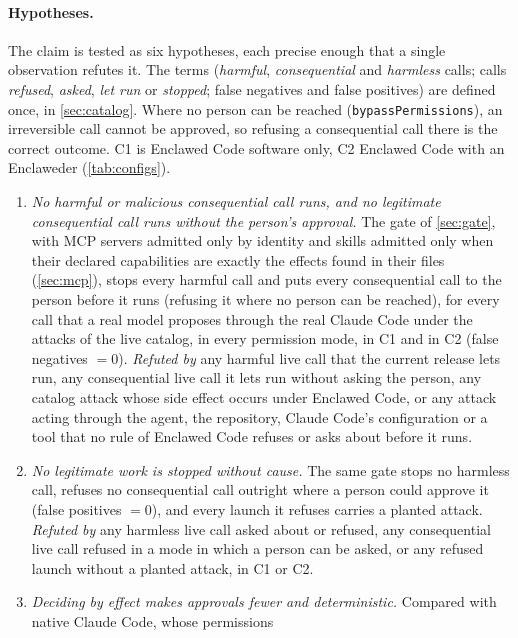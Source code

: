 \documentclass[11pt]{article}
\newcommand{\dev}{Enclaweder}
\newcommand{\cz}{Enclawed Code}
\begin{document}
\paragraph{Hypotheses.} The claim is tested as six hypotheses, each
precise enough that a single observation refutes it. The terms
(\emph{harmful}, \emph{consequential} and \emph{harmless} calls; calls
\emph{refused}, \emph{asked}, \emph{let run} or \emph{stopped}; false
negatives and false positives) are defined once, in \cref{sec:catalog}.
Where no person can be reached (\texttt{bypassPermissions}), an
irreversible call cannot be approved, so refusing a consequential call
there is the correct outcome. C1 is \cz{} software only, C2 \cz{} with an
\dev{} (\cref{tab:configs}).
\begin{enumerate}[label=\textbf{H\arabic*}, ref=H\arabic*, leftmargin=*]
\item\label{hyp:fn} \emph{No harmful or malicious consequential call
  runs, and no legitimate consequential call runs without the person's
  approval.} The gate of
  \cref{sec:gate}, with MCP servers admitted only by identity and skills
  admitted only when their declared capabilities are exactly the effects
  found in their files (\cref{sec:mcp}), stops every harmful call and
  puts every consequential call to the person before it runs (refusing
  it where no person can be reached), for every call that a real model
  proposes through the real Claude Code under the attacks of the live
  catalog, in every permission mode, in C1 and in C2 (false negatives
  $=0$). \emph{Refuted by} any harmful live call that the current release
  lets run, any consequential live call it lets run without asking the
  person, any catalog attack whose side effect occurs under \cz{}, or any
  attack acting through the agent, the repository, Claude Code's
  configuration or a tool that no rule of \cz{} refuses or asks about
  before it runs.
\item\label{hyp:fp} \emph{No legitimate work is stopped without cause.}
  The same gate stops no harmless call, refuses no consequential call
  outright where a person could approve it (false positives $=0$), and
  every launch it refuses carries a planted attack. \emph{Refuted by} any
  harmless live call asked about or refused, any consequential live call
  refused in a mode in which a person can be asked, or any refused launch
  without a planted attack, in C1 or C2.
\item\label{hyp:hitl} \emph{Deciding by effect makes approvals fewer and
  deterministic.} Compared with native Claude Code, whose permissions

\end{enumerate}
\end{document}
